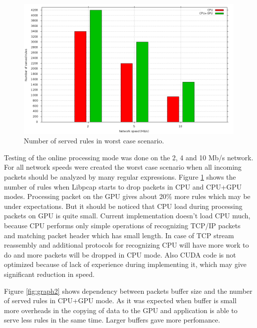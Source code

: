 \documentclass[thesis=M,english]{FITthesis}[2011/07/15]
\begin{document}
\begin{figure}[h]
\centering
\includegraphics[scale=0.3]{images/graph1.png}
\caption{Number of served rules in worst case scenario.}
\label{fig:graph1}
\end{figure}

Testing of the online processing mode was done on the 2, 4 and 10 Mb/s network. For all network speeds were created the worst case scenario when all incoming packets should be analyzed by many regular expressions. Figure \ref{fig:graph1} shows the number of rules when Libpcap starts to drop packets in CPU and CPU+GPU modes. Processing packet on the GPU gives about 20\% more rules which may be under expectations. But it should be noticed that CPU load during processing packets on GPU is quite small. Current implementation doesn't load CPU much, because CPU performs only simple operations of recognizing TCP/IP packets and matching packet header which has small length. In case of TCP stream reassembly and additional protocols for recognizing CPU will have more work to do and more packets will be dropped in CPU mode. Also CUDA code is not optimized because of lack of experience during implementing it, which may give significant reduction in speed.

Figure \ref{fig:graph2} shows dependency between packets buffer size and the number of served rules in CPU+GPU mode. As it was expected when buffer is small more overheads in the copying of data to the GPU and application is able to serve less rules in the same time. Larger buffers gave more perfomance.
\end{document}
